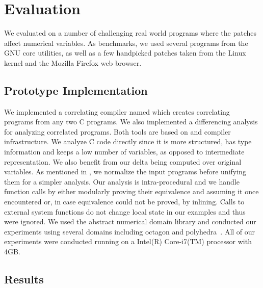 \section{Evaluation}
We evaluated {\tool} on a number of challenging real world programs where the patches affect numerical variables. As benchmarks, we used several programs from the GNU core utilities, as well as a few handpicked patches taken from the Linux kernel and the Mozilla Firefox web browser.

\subsection{Prototype Implementation}
We implemented a correlating compiler named  which creates correlating programs from any two C programs. We also implemented a differencing analysis for analyzing correlated programs. Both tools are based on  and  compiler infrastructure. We analyze C code directly since it is more structured, has type information and keeps a low number of variables, as opposed to intermediate representation. We also benefit from our delta being computed over original variables. As mentioned in , we normalize the input programs before unifying them for a simpler analysis. Our analysis is intra-procedural and we handle function calls by either modularly proving their equivalence and assuming it once encountered or, in case equivalence could not be proved, by inlining. Calls to external system functions do not change local state in our examples and thus were ignored. We used the  abstract numerical domain library and conducted our experiments using several domains including octagon \cite{Mine2006} and polyhedra~\cite{CousotHalbwachs78}. All of our experiments were conducted running on a Intel(R) Core-i7(TM) processor with 4GB.

\subsection{Results}



